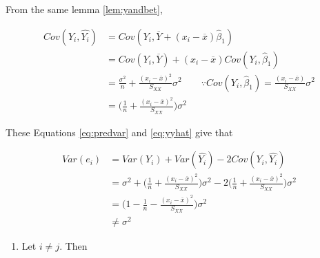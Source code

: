 \documentclass[]{book}
\providecommand{\tightlist}{%
  \setlength{\itemsep}{0pt}\setlength{\parskip}{0pt}}
\theoremstyle{definition}
\theoremstyle{definition}
\theoremstyle{definition}
\theoremstyle{remark}
\begin{document}
From the same lemma \ref{lem:yandbet},

\begin{equation}
  \begin{split}
    Cov(Y_i, \hat{Y_i}) & = Cov(Y_i, \overline{Y} + (x_i - \overline{x}) \hat\beta_1) \\
    & = Cov(Y_i, \overline{Y}) + (x_i - \overline{x}) Cov(Y_i, \hat\beta_1) \\
    & = \frac{\sigma^2}{n} + \frac{(x_i - \overline{x})^2}{S_{XX}}\sigma^2 \qquad \because Cov(Y_i, \hat\beta_1) = \frac{(x_i - \overline{x})}{S_{XX}}\sigma^2 \\
    & = \bigg( \frac{1}{n} + \frac{(x_i - \overline{x})^2}{S_{XX}} \bigg)\sigma^2
  \end{split}
  \label{eq:yyhat}
\end{equation}

These Equations \eqref{eq:predvar} and \eqref{eq:yyhat} give that

\begin{equation}
  \begin{split}
    Var(e_i) & = Var(Y_i) + Var(\hat{Y_i}) -2Cov(Y_i, \hat{Y_i}) \\
    & = \sigma^2 + \bigg( \frac{1}{n} + \frac{(x_i - \overline{x})^2}{S_{XX}} \bigg)\sigma^2 - 2 \bigg( \frac{1}{n} + \frac{(x_i - \overline{x})^2}{S_{XX}} \bigg)\sigma^2 \\
    & = \bigg(1 - \frac{1}{n} - \frac{(x_i - \overline{x})^2}{S_{XX}} \bigg)\sigma^2 \\
    & \neq \sigma^2
  \end{split}
  \label{eq:residvar}
\end{equation}

\begin{enumerate}
\def\labelenumi{(\alph{enumi})}
\setcounter{enumi}{2}
\tightlist
\item
  Let \(i \neq j\). Then
\end{enumerate}
\end{document}
